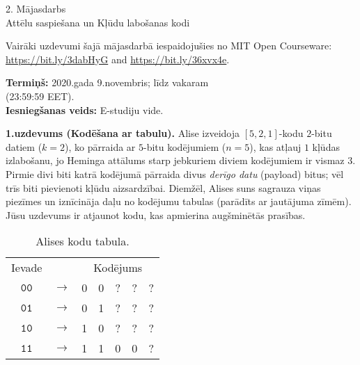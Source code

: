 \documentclass[a4paper]{article}
\begin{document}
\twocolumn

\begin{center}
{\Large 2. Mājasdarbs}\\
{\Large Attēlu saspiešana un Kļūdu labošanas kodi}
\end{center}

{\footnotesize
Vairāki uzdevumi šajā mājasdarbā iespaidojušies no MIT Open Courseware:
\url{https://bit.ly/3dabHyG} and \url{https://bit.ly/36xvx4e}.\\
}


{\bf Termiņš:} 2020.gada 9.novembris; līdz vakaram\\ (23:59:59 EET).\\
{\bf Iesniegšanas veids:} E-studiju vide.


\vspace{10pt}
{\bf 1.uzdevums (Kodēšana ar tabulu).}
Alise izveidoja $[5,2,1]$-kodu $2$-bitu datiem ($k=2$), 
ko pārraida ar $5$-bitu kodējumiem
($n=5$), kas atļauj $1$ kļūdas izlabošanu, 
jo He\-min\-ga attālums starp jebkuriem diviem kodējumiem 
ir vismaz $3$.
Pirmie divi biti katrā kodējumā pārraida divus {\em derīgo datu} (payload)
bitus; vēl trīs biti pievienoti kļūdu aizsardzībai.
Diemžēl, Alises suns sagrauza viņas piezīmes un iznīcināja
daļu no kodējumu tabulas (parādīts ar jautājuma zī\-mēm).
Jūsu uzdevums ir atjaunot kodu, kas apmierina augš\-mi\-nē\-tās prasības.

{\footnotesize
\begin{table}[h]
\begin{center}
\begin{tabular}{ccccccc}
Ievade & & \multicolumn{5}{c}{Kodējums} \\
$\mathtt{00}$ & $\rightarrow$ & 0 & 0 & ? & ? & ? \\
$\mathtt{01}$ & $\rightarrow$ & 0 & 1 & ? & ? & ? \\
$\mathtt{10}$ & $\rightarrow$ & 1 & 0 & ? & ? & ? \\
$\mathtt{11}$ & $\rightarrow$ & 1 & 1 & 0 & 0 & ? \\
\end{tabular}
\caption{\label{tab:codes523} Alises kodu tabula.}
\end{center}
\end{table}
}
\end{document}
